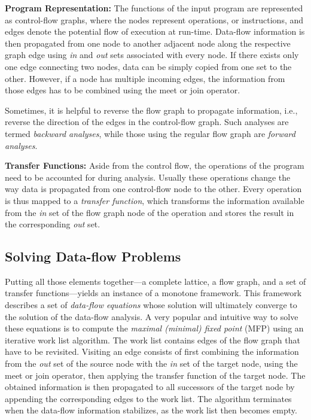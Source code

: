 \textbf{Program Representation:}
The functions of the input program are represented as control-flow graphs, where
the nodes represent operations, or instructions, and edges denote the potential
flow of execution at run-time.
Data-flow information is then propagated from one node to
another adjacent node along the respective graph edge using \emph{in} and
\emph{out} sets associated with every node. If there exists only one edge
connecting two nodes, data can be simply copied from one set to the other.
However, if a node has multiple incoming edges, the information from
those edges has to be combined using the meet or join operator.

Sometimes, it is helpful to reverse the flow graph to propagate information,
i.e., reverse the direction of the edges in the control-flow graph. Such
analyses are termed \emph{backward analyses}, while 
those using the
regular flow graph are \emph{forward analyses}.

\textbf{Transfer Functions:}
Aside from the control flow, the operations of the program
need to be accounted for during analysis.
Usually these operations change the way data is propagated from one control-flow node to the other. Every operation is thus mapped
to a \emph{transfer function}, which transforms the information available from
the \emph{in} set of the flow graph node of the  operation and stores the 
result in the corresponding \emph{out} set.

\subsection{Solving Data-flow Problems}

Putting all those elements together---a complete lattice, a flow graph, and
a set of transfer functions---yields an instance of a monotone framework.
This framework describes a set of \emph{data-flow equations} whose solution will
ultimately converge to the solution of the data-flow analysis. A very popular and
intuitive way to solve these equations is to compute the \emph{maximal 
(minimal) fixed point} (MFP)
using
an iterative work list algorithm. The work list contains edges of the flow graph
that have to be revisited.
Visiting an edge consists of first combining the information from the \emph{out}
set of the source node with the \emph{in} set of the target node,
using the meet or join operator, then applying the transfer function of the
target node. The obtained information is then propagated to all successors
of the target node by appending the corresponding edges to the work list.
The algorithm terminates when the data-flow information stabilizes, as the work
list then becomes empty.

